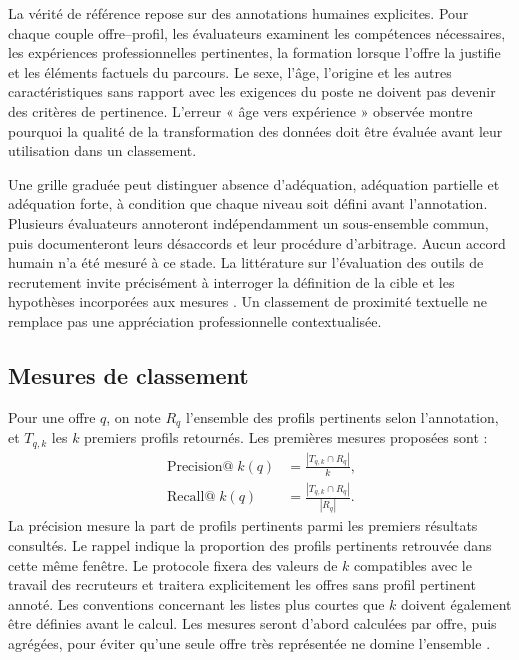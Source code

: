 La vérité de référence repose sur des annotations humaines explicites. Pour chaque couple offre--profil, les évaluateurs examinent les compétences nécessaires, les expériences professionnelles pertinentes, la formation lorsque l'offre la justifie et les éléments factuels du parcours. Le sexe, l'âge, l'origine et les autres caractéristiques sans rapport avec les exigences du poste ne doivent pas devenir des critères de pertinence. L'erreur « âge vers expérience » observée montre pourquoi la qualité de la transformation des données doit être évaluée avant leur utilisation dans un classement.

Une grille graduée peut distinguer absence d'adéquation, adéquation partielle et adéquation forte, à condition que chaque niveau soit défini avant l'annotation. Plusieurs évaluateurs annoteront indépendamment un sous-ensemble commun, puis documenteront leurs désaccords et leur procédure d'arbitrage. Aucun accord humain n'a été mesuré à ce stade. La littérature sur l'évaluation des outils de recrutement invite précisément à interroger la définition de la cible et les hypothèses incorporées aux mesures \cite{raghavan2020}. Un classement de proximité textuelle ne remplace pas une appréciation professionnelle contextualisée.

\subsection{Mesures de classement}

Pour une offre $q$, on note $R_q$ l'ensemble des profils pertinents selon l'annotation, et $T_{q,k}$ les $k$ premiers profils retournés. Les premières mesures proposées sont :
\begin{align}
\operatorname{Precision@}k(q) &= \frac{|T_{q,k}\cap R_q|}{k}, \\
\operatorname{Recall@}k(q) &= \frac{|T_{q,k}\cap R_q|}{|R_q|}.
\end{align}
La précision mesure la part de profils pertinents parmi les premiers résultats consultés. Le rappel indique la proportion des profils pertinents retrouvée dans cette même fenêtre. Le protocole fixera des valeurs de $k$ compatibles avec le travail des recruteurs et traitera explicitement les offres sans profil pertinent annoté. Les conventions concernant les listes plus courtes que $k$ doivent également être définies avant le calcul. Les mesures seront d'abord calculées par offre, puis agrégées, pour éviter qu'une seule offre très représentée ne domine l'ensemble \cite{manning2008}.

